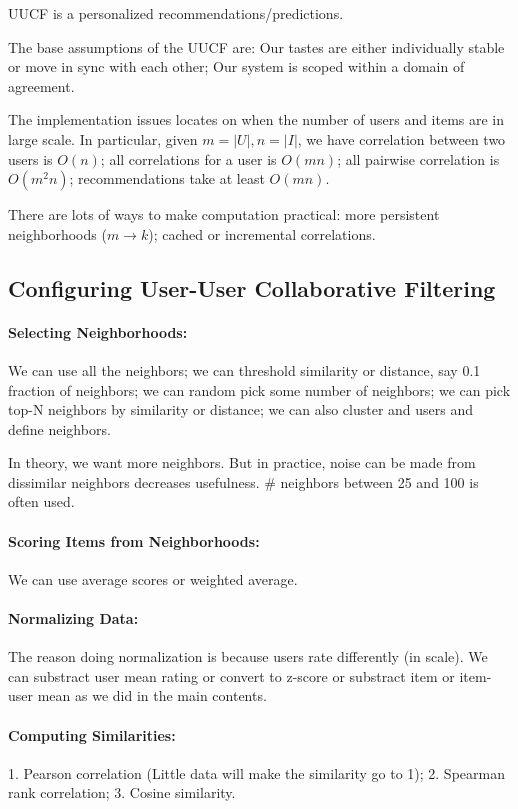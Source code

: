 \documentclass{article}
\theoremstyle{definition}
\begin{document}
UUCF is a personalized recommendations/predictions.

The base assumptions of the UUCF are: Our tastes are either individually stable or move in sync with each other; Our system is scoped within a domain of agreement.

The implementation issues locates on when the number of users and items are in large scale. In particular, given $m = |U|, n = |I|$, we have correlation between two users is $O(n)$; all correlations for a user is $O(mn)$; all pairwise correlation is $O(m^2n)$; recommendations take at least $O(mn)$. 

There are lots of ways to make computation practical: more persistent neighborhoods ($m \to k$); cached or incremental correlations.

\subsection{Configuring User-User Collaborative Filtering}
\paragraph{Selecting Neighborhoods:}
We can use all the neighbors; we can threshold similarity or distance, say 0.1 fraction of neighbors; we can random pick some number of neighbors; we can pick top-N neighbors by similarity or distance; we can also cluster and users and define neighbors. 

In theory, we want more neighbors. But in practice, noise can be made from dissimilar neighbors decreases usefulness. \# neighbors between 25 and 100 is often used.

\paragraph{Scoring Items from Neighborhoods:} We can use average scores or weighted average. 

\paragraph{Normalizing Data:} The reason doing normalization is because users rate differently (in scale). We can substract user mean rating or convert to z-score or substract item or item-user mean as we did in the main contents. 

\paragraph{Computing Similarities:} 1. Pearson correlation (Little data will make the similarity go to 1); 2. Spearman rank correlation; 3. Cosine similarity. 
\end{document}
